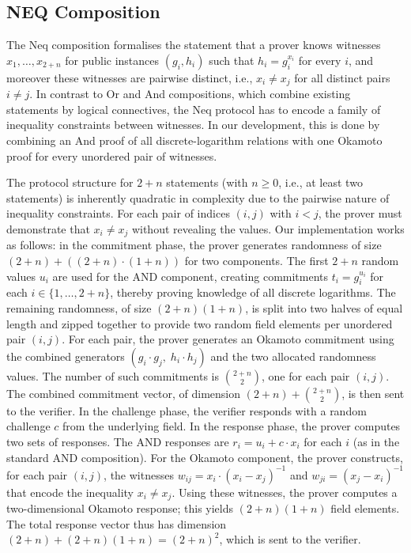 \subsection{NEQ Composition}
The Neq composition formalises the statement that a prover knows witnesses
$x_1, \ldots, x_{2+n}$ for public instances $(g_i, h_i)$ such that $h_i = g_i^{x_i}$ for every
$i$, and moreover these witnesses are pairwise distinct, i.e., $x_i \neq x_j$ for all distinct pairs $i \neq j$.
In contrast to Or and And compositions, which combine existing statements by logical connectives, the Neq protocol has to encode a family of inequality constraints between witnesses.  In our development, this is done by combining an And proof of all discrete-logarithm relations with one Okamoto proof for every unordered pair of witnesses.

The protocol structure for $2+n$ statements (with $n \ge 0$, i.e., at least two statements) is inherently quadratic in complexity due to the pairwise nature of inequality constraints. For each pair of indices $(i, j)$ with $i < j$, the prover must demonstrate that $x_i \neq x_j$ without revealing the values. Our implementation works as follows: in the commitment phase, the prover generates randomness of size $(2 + n) + ((2 + n) \cdot (1 + n))$ for two components. The first $2+n$ random values $u_i$ are used for the AND component, creating commitments $t_i = g_i^{u_i}$ for each $i \in \{1,\dots,2+n\}$, thereby proving knowledge of all discrete logarithms. The remaining randomness, of size $(2+n)(1+n)$, is split into two halves of equal length and zipped together to provide two random field elements per unordered pair $(i,j)$. For each pair, the prover generates an Okamoto commitment using the combined generators $(g_i \cdot g_j,\; h_i \cdot h_j)$ and the two allocated randomness values.
The number of such commitments is $\binom{2+n}{2}$, one for each  pair $(i,j)$. The combined commitment vector, of dimension $(2+n) + \binom{2+n}{2}$, is then sent to the verifier. In the challenge phase, the verifier responds with a random challenge $c$ from the underlying field. In the response phase, the prover computes two sets of responses. The AND responses are $r_i = u_i + c \cdot x_i$ for each $i$ (as in the standard AND composition). For the Okamoto component, the prover constructs, for each pair $(i,j)$, the witnesses $w_{ij} = x_i \cdot (x_i - x_j)^{-1}$ and $w_{ji} = (x_j - x_i)^{-1}$ that encode the inequality $x_i \neq x_j$. Using these witnesses, the prover computes a two-dimensional Okamoto response; this yields $(2+n)(1+n)$ field elements. The total response vector thus has dimension $(2+n) + (2+n)(1+n) = (2+n)^2$, which is sent to the verifier.

